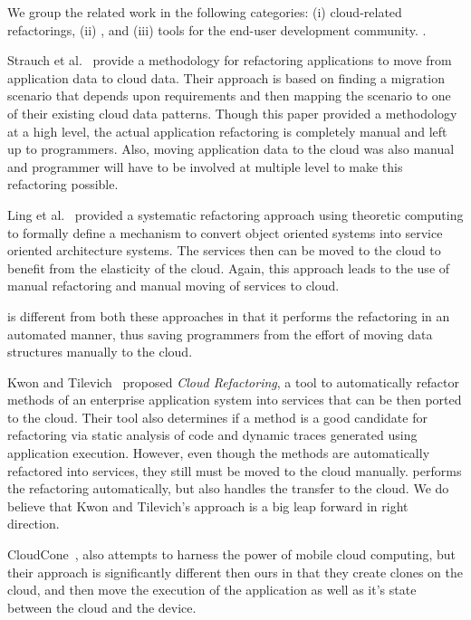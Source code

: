 \documentclass{sigplanconf}
\begin{document}
We group the related work in the following categories: (i) cloud-related refactorings, (ii) , and (iii) tools for the end-user development community. .

Strauch et al.~\cite{strauchmigrating} provide a methodology for refactoring applications to move from application data to cloud data.  Their approach is based on finding a migration scenario that depends upon requirements and then mapping the scenario to one of their existing cloud data patterns. Though this paper provided a methodology at a high level, the actual application refactoring is completely manual and left up to programmers. Also, moving application data to the cloud was also manual  and programmer will have to be involved at multiple level to make this refactoring possible.  

Ling et al.~\cite{ling2010refactoring} provided a systematic refactoring approach using theoretic computing to formally define a mechanism to convert object oriented systems into service oriented architecture systems. The services then can be moved to the cloud to benefit from the elasticity of the cloud. Again, this approach leads to the use of manual refactoring and manual moving of services to cloud. 

\tool is different from both these approaches in that it performs the refactoring in an automated manner, thus saving programmers from the effort of moving data structures manually to the cloud.  

Kwon and Tilevich~\cite{kwon2013cloud} proposed \emph{Cloud Refactoring}, a tool to automatically refactor methods of an enterprise application system into services that can be then ported to the cloud. Their tool also determines if a method is a good candidate for refactoring via static analysis of code and dynamic traces generated using application execution. However, even though the methods are automatically refactored into services, they still must be moved to the cloud manually.  \tool performs the refactoring automatically, but also handles the transfer to the cloud.  We do believe that Kwon and Tilevich's approach is a big leap forward in right direction.  

CloudCone~\cite{chun2011clonecloud}, also attempts to harness the power of mobile cloud computing, but their approach is significantly different then ours in that they create clones on the cloud, and then move the execution of the application as well as it's state between the cloud and the device.
\end{document}
